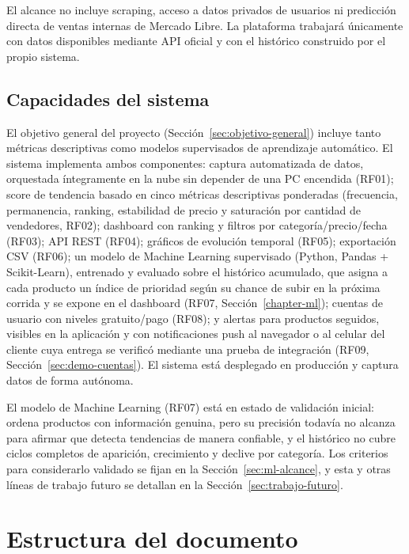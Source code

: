 El alcance no incluye scraping, acceso a datos privados de usuarios ni predicción directa de ventas internas de Mercado Libre. La plataforma trabajará únicamente con datos disponibles mediante API oficial y con el histórico construido por el propio sistema.

\subsection*{Capacidades del sistema}

El objetivo general del proyecto (Sección~\ref{sec:objetivo-general}) incluye tanto métricas descriptivas como modelos supervisados de aprendizaje automático. El sistema implementa ambos componentes: captura automatizada de datos, orquestada íntegramente en la nube sin depender de una PC encendida (RF01); score de tendencia basado en cinco métricas descriptivas ponderadas (frecuencia, permanencia, ranking, estabilidad de precio y saturación por cantidad de vendedores, RF02); dashboard con ranking y filtros por categoría/precio/fecha (RF03); API REST (RF04); gráficos de evolución temporal (RF05); exportación CSV (RF06); un modelo de Machine Learning supervisado (Python, Pandas + Scikit-Learn), entrenado y evaluado sobre el histórico acumulado, que asigna a cada producto un índice de prioridad según su chance de subir en la próxima corrida y se expone en el dashboard (RF07, Sección~\ref{chapter-ml}); cuentas de usuario con niveles gratuito/pago (RF08); y alertas para productos seguidos, visibles en la aplicación y con notificaciones push al navegador o al celular del cliente cuya entrega se verificó mediante una prueba de integración (RF09, Sección~\ref{sec:demo-cuentas}). El sistema está desplegado en producción y captura datos de forma autónoma.

El modelo de Machine Learning (RF07) está en estado de validación inicial: ordena productos con información genuina, pero su precisión todavía no alcanza para afirmar que detecta tendencias de manera confiable, y el histórico no cubre ciclos completos de aparición, crecimiento y declive por categoría. Los criterios para considerarlo validado se fijan en la Sección~\ref{sec:ml-alcance}, y esta y otras líneas de trabajo futuro se detallan en la Sección~\ref{sec:trabajo-futuro}.

\section{Estructura del documento}\label{sec:estructura}


